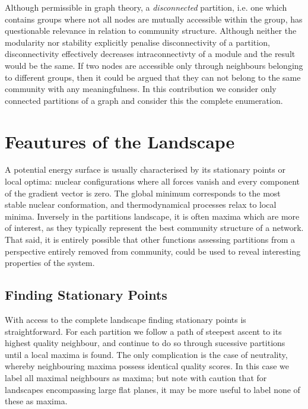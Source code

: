 Although permissible in graph theory, a \textit{disconnected} partition, i.e. one which contains groups where not all nodes are mutually accessible within the group, has questionable relevance in relation to community structure.  Although neither the modularity nor stability explicitly penalise disconnectivity of a partition, disconnectivity effectively decreases intraconnectivty of a module and the result would be the same.  If two nodes are accessible only through neighbours belonging to different groups, then it could be argued that they can not belong to the same community with any meaningfulness.  In this contribution we consider only connected partitions of a graph and consider this the complete enumeration.

\section{Feautures of the Landscape}
\label{sec:featuresOfTheLandscape}

A potential energy surface is usually characterised by its stationary points or local optima: nuclear configurations where all forces vanish and every component of the gradient vector is zero\cite{Wales2005}.  The global minimum corresponds to the most stable nuclear conformation, and thermodynamical processes relax to local minima.  Inversely in the partitions landscape, it is often maxima which are more of interest, as they typically represent the best community structure of a network.  That said, it is entirely possible that other functions assessing partitions from a perspective entirely removed from community, could be used to reveal interesting properties of the system.

\subsection*{Finding Stationary Points}
With access to the complete landscape finding stationary points is straightforward.  For each partition we follow a path of steepest ascent to its highest quality neighbour, and continue to do so through sucessive partitions until a local maxima is found.  The only complication is the case of neutrality, whereby neighbouring maxima possess identical quality scores.  In this case we label all maximal neighbours as maxima; but note with caution that for landscapes encompassing large flat planes, it may be more useful to label none of these as maxima.

